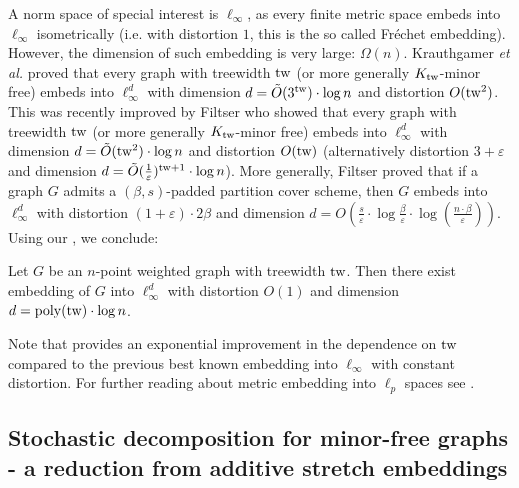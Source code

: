 \documentclass{article}
\newcommand{\tw}{{\rm tw}}
\newcommand{\poly}{\mathrm{poly}}
\newcommand{\etal}{{\em et al. \xspace}}
\def\eps{\varepsilon}
\begin{document}
A norm space of special interest is $\ell_\infty$, as every finite metric space embeds into $\ell_\infty$ isometrically (i.e. with distortion $1$, this is the so called Fr\'echet embedding). However, the dimension of such embedding is very large: $\Omega(n)$.
Krauthgamer \etal \cite{KLMN04} proved that every graph with treewidth $\tw$ (or more generally $K_{\tw}$-minor free) embeds into $\ell^d_\infty$ with dimension $d=\tilde{O}(3^\tw)\cdot\log n$ and distortion $O(\tw^2)$.
This was recently improved by Filtser \cite{Filtser24} who showed that every graph with treewidth $\tw$ (or more generally $K_{\tw}$-minor free) embeds into $\ell^d_\infty$ with dimension $d=\tilde{O}(\tw^2)\cdot\log n$  and distortion $O(\tw)$ (alternatively distortion $3+\eps$ and dimension $d=\tilde{O}(\frac{1}{\eps})^{\tw+1}\cdot\log n$).
More generally, Filtser \cite{Filtser24} proved that if a graph $G$ admits a $(\beta,s)$-padded partition cover scheme, then $G$ embeds into $\ell^d_\infty$ with distortion 
$(1+\eps)\cdot2\beta$ and dimension $d=O\left(\frac{s}{\eps}\cdot\log\frac{\beta}{\eps}\cdot\log(\frac{n\cdot\beta}{\eps})\right)$. Using our , we conclude:
\begin{corollary}\label{cor:EmbeddingLinfty}
	Let $G$ be an $n$-point weighted graph with treewidth $\tw$. Then there exist embedding of $G$ into $\ell^d_\infty$ with distortion $O(1)$ and dimension $d=\poly(\tw)\cdot\log n$.
\end{corollary}
Note that  provides an exponential improvement in the dependence on $\tw$ compared to the previous best known embedding into $\ell_\infty$ with constant distortion.
For further reading about metric embedding into $\ell_p$ spaces see \cite{OS81,Bou85,LLR95,Rao99,KLMN04,GNRS04,LR10,AFGN22,KLR19,Fil19,Kumar22,Filtser24}.

\subsection{Stochastic decomposition for minor-free graphs - a reduction from additive stretch embeddings}\label{subsec:stocdecomp}
\end{document}
